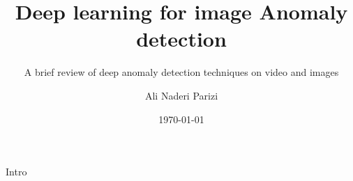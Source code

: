 \documentclass{beamer}
\title{Deep learning for image Anomaly detection}
\subtitle{A brief review of deep anomaly detection techniques on video and images}
\author{Ali Naderi Parizi}
\institute{Iran university of sciance and technology}
\date{\today}
\begin{document}
	\begin{frame}
    		\titlepage
	\end{frame}
	\begin{frame}{Intro}
	\end{frame}
\end{document}
